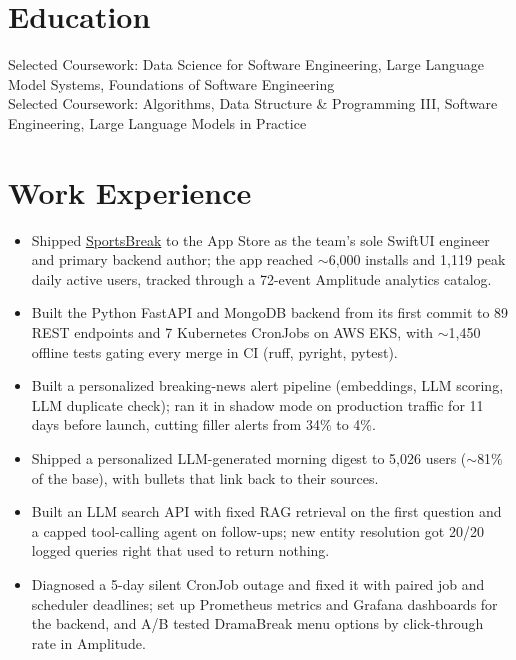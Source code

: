 \documentclass[11pt, letterpaper]{article}
\begin{document}

\section{Education}
Selected Coursework: Data Science for Software Engineering, Large Language Model Systems, Foundations of Software Engineering\\[1pt]
Selected Coursework: Algorithms, Data Structure \& Programming III, Software Engineering, Large Language Models in Practice

\section{Work Experience}
\begin{itemize}
  \item Shipped \href{https://apps.apple.com/app/id6762649287}{SportsBreak} to the App Store as the team's sole SwiftUI engineer and primary backend author; the app reached $\sim$6{,}000 installs and 1{,}119 peak daily active users, tracked through a 72-event Amplitude analytics catalog.
  \item Built the Python FastAPI and MongoDB backend from its first commit to 89 REST endpoints and 7 Kubernetes CronJobs on AWS EKS, with $\sim$1{,}450 offline tests gating every merge in CI (ruff, pyright, pytest).
  \item Built a personalized breaking-news alert pipeline (embeddings, LLM scoring, LLM duplicate check); ran it in shadow mode on production traffic for 11 days before launch, cutting filler alerts from 34\% to 4\%.
  \item Shipped a personalized LLM-generated morning digest to 5{,}026 users ($\sim$81\% of the base), with bullets that link back to their sources.
  \item Built an LLM search API with fixed RAG retrieval on the first question and a capped tool-calling agent on follow-ups; new entity resolution got 20/20 logged queries right that used to return nothing.
  \item Diagnosed a 5-day silent CronJob outage and fixed it with paired job and scheduler deadlines; set up Prometheus metrics and Grafana dashboards for the backend, and A/B tested DramaBreak menu options by click-through rate in Amplitude.
\end{itemize}
\end{document}
